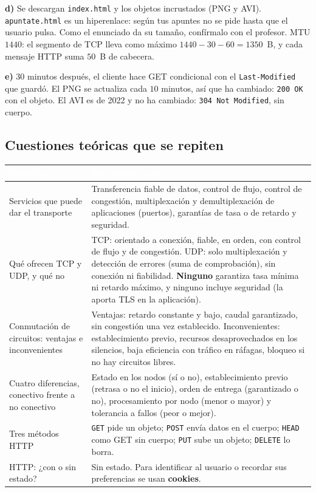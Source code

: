 \documentclass[11pt,a4paper]{article}
\newcommand{\hd}[1]{\cellcolor{uahblue}\textcolor{white}{\textbf{#1}}}
\begin{document}
\textbf{d)} Se descargan \texttt{index.html} y los objetos incrustados (PNG y AVI). \texttt{apuntate.html} es un hiperenlace: según tus apuntes no se pide hasta que el usuario pulsa. Como el enunciado da su tamaño, confírmalo con el profesor. MTU $1440$: el segmento de TCP lleva como máximo $1440-30-60=1350$~B, y cada mensaje HTTP suma $50$~B de cabecera.

\textbf{e)} $30$ minutos después, el cliente hace GET condicional con el \texttt{Last-Modified} que guardó. El PNG se actualiza cada $10$ minutos, así que ha cambiado: \texttt{200 OK} con el objeto. El AVI es de 2022 y no ha cambiado: \texttt{304 Not Modified}, sin cuerpo.

\subsection{Cuestiones teóricas que se repiten}

\begin{tabularx}{\textwidth}{@{}L{4.6cm}X@{}}
\toprule
\hd{Cuestión} & \hd{Respuesta corta} \\
\midrule
Servicios que puede dar el transporte & Transferencia fiable de datos, control de flujo, control de congestión, multiplexación y demultiplexación de aplicaciones (puertos), garantías de tasa o de retardo y seguridad. \\
Qué ofrecen TCP y UDP, y qué no & TCP: orientado a conexión, fiable, en orden, con control de flujo y de congestión. UDP: solo multiplexación y detección de errores (suma de comprobación), sin conexión ni fiabilidad. \textbf{Ninguno} garantiza tasa mínima ni retardo máximo, y ninguno incluye seguridad (la aporta TLS en la aplicación). \\
Conmutación de circuitos: ventajas e inconvenientes & Ventajas: retardo constante y bajo, caudal garantizado, sin congestión una vez establecido. Inconvenientes: establecimiento previo, recursos desaprovechados en los silencios, baja eficiencia con tráfico en ráfagas, bloqueo si no hay circuitos libres. \\
Cuatro diferencias, conectivo frente a no conectivo & Estado en los nodos (sí o no), establecimiento previo (retrasa o no el inicio), orden de entrega (garantizado o no), procesamiento por nodo (menor o mayor) y tolerancia a fallos (peor o mejor). \\
Tres métodos HTTP & \texttt{GET} pide un objeto; \texttt{POST} envía datos en el cuerpo; \texttt{HEAD} como GET sin cuerpo; \texttt{PUT} sube un objeto; \texttt{DELETE} lo borra. \\
HTTP: ¿con o sin estado? & Sin estado. Para identificar al usuario o recordar sus preferencias se usan \textbf{cookies}. \\
\bottomrule
\end{tabularx}
\end{document}
